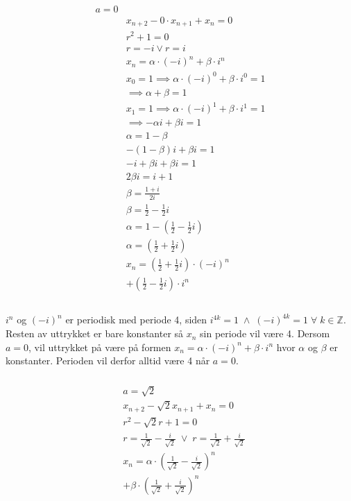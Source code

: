 \documentclass[defaultpackages]{cheatsheet}
\begin{document}
\subsubsection{}
\begin{align*}
	a=0 \\
&	x_{n+2}-0\cdot x_{n+1} + x_n = 0\\
&	r^2+1=0\\
&	r = -i \vee r = i\\
&	x_n = \alpha \cdot \left(-i\right)^n + \beta \cdot i^n\\
&	x_0 = 1 \implies \alpha \cdot \left(-i\right)^0 + \beta \cdot i^0 = 1 \\
&   \implies \alpha + \beta = 1\\
&	x_1 = 1 \implies \alpha \cdot \left(-i\right)^1 + \beta \cdot i^1 = 1 \\
&   \implies -\alpha i + \beta i = 1\\
&	\alpha = 1 - \beta\\
&	-\left(1 - \beta\right)i + \beta i = 1\\
&	-i + \beta i + \beta i = 1\\
&	2\beta i = i+1\\
&	\beta = \frac{1+i}{2i}\\
&	\beta = \frac{1}{2} - \frac{1}{2} i\\
&	\alpha = 1 - \left(\frac{1}{2} - \frac{1}{2} i\right)\\
&	\alpha = \left(\frac{1}{2} + \frac{1}{2} i\right)\\
&	x_n =	\left(\frac{1}{2} + \frac{1}{2} i\right) \cdot (-i)^n\\
&+ \left(\frac{1}{2} - \frac{1}{2} i\right) \cdot i^n\\
\end{align*}
\subsubsection{}
$i^n$ og $(-i)^n$ er periodisk med periode 4, siden $i^{4k}=1 \;\wedge\; (-i)^{4k}=1 \;\forall\; k \in \mathbb{Z}$. Resten av uttrykket er bare konstanter så $x_n$ sin periode vil være 4. Dersom $a=0$, vil uttrykket på være på formen $x_n = \alpha \cdot \left(-i\right)^n + \beta \cdot i^n$ hvor $\alpha$ og $\beta$ er konstanter. Perioden vil derfor alltid være 4 når $a=0$.
\subsubsection{}
\begin{align*}
	&a= \sqrt{2}\\
	&x_{n+2} - \sqrt{2}x_{n+1} + x_n = 0\\
	&r^2 - \sqrt{2}r + 1 = 0\\
	&r = \frac{1}{\sqrt{2}}-\frac{i}{\sqrt{2}} \;\vee\; r =\frac{1}{\sqrt{2}}+\frac{i}{\sqrt{2}}\\
&	x_n = \alpha \cdot \left(\frac{1}{\sqrt{2}}-\frac{i}{\sqrt{2}}\right)^n\\
&+ \beta \cdot \left(\frac{1}{\sqrt{2}}+\frac{i}{\sqrt{2}}\right)^n
\end{align*}
\end{document}
